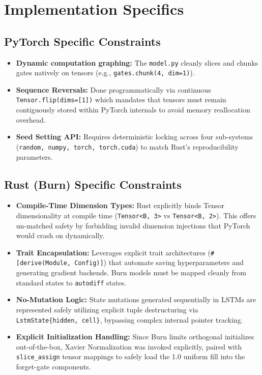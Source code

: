 \documentclass[12pt]{article}
\begin{document}
\section{Implementation Specifics}
\subsection{PyTorch Specific Constraints}
\begin{itemize}
    \item \textbf{Dynamic computation graphing:} The \texttt{model.py} cleanly slices and chunks gates natively on tensors (e.g., \texttt{gates.chunk(4, dim=1)}).
    \item \textbf{Sequence Reversals:} Done programmatically via continuous \texttt{Tensor.flip(dims=[1])} which mandates that tensors must remain contiguously stored within PyTorch internals to avoid memory reallocation overhead.
    \item \textbf{Seed Setting API:} Requires deterministic locking across four sub-systems (\texttt{random, numpy, torch, torch.cuda}) to match Rust's reproducibility parameters.
\end{itemize}

\subsection{Rust (Burn) Specific Constraints}
\begin{itemize}
    \item \textbf{Compile-Time Dimension Types:} Rust explicitly binds Tensor dimensionality at compile time (\texttt{Tensor<B, 3>} vs \texttt{Tensor<B, 2>}). This offers un-matched safety by forbidding invalid dimension injections that PyTorch would crash on dynamically.
    \item \textbf{Trait Encapsulation:} Leverages explicit trait architectures (\texttt{\#[derive(Module, Config)]}) that automate saving hyperparameters and generating gradient backends. Burn models must be mapped cleanly from standard states to \texttt{autodiff} states.
    \item \textbf{No-Mutation Logic:} State mutations generated sequentially in LSTMs are represented safely utilizing explicit tuple destructuring via \texttt{LstmState\{hidden, cell\}}, bypassing complex internal pointer tracking.
    \item \textbf{Explicit Initialization Handling:} Since Burn limits orthogonal initializes out-of-the-box, Xavier Normalization was invoked explicitly, paired with \texttt{slice\_assign} tensor mappings to safely load the 1.0 uniform fill into the forget-gate components. 
\end{itemize}
\end{document}
